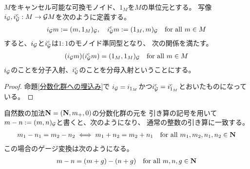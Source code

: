 	\begin{proposition}[分数化群への標準入射]\label{prop:分数化群への標準入射} %
		$M$をキャンセル可能な可換モノイド、$1_M$を$M$の単位元とする。
		写像$i_{{\mathcal{G}}},i_{{\mathcal{G}}}^c:M\to{\ensuremath{{\mathcal{G}}}} M$を次のように定義する。
		\begin{equation*}\begin{split}
			i_{{\mathcal{G}}} m := (m,1_M)_{{\mathcal{G}}},\quad i_{{\mathcal{G}}}^cm := (1_M,m)_{{\mathcal{G}}}
			\quad\text{for all }m\in M
		\end{split}\end{equation*}
		すると、$i_{{\mathcal{G}}}$と$i_{{\mathcal{G}}}^c$は$1:1$のモノイド準同型となり、
		次の関係を満たす。
		\begin{equation*}\begin{split}
			(i_{{\mathcal{G}}} m)(i_{{\mathcal{G}}}^c m) = (1_M,1_M)_{{\mathcal{G}}} \quad\text{for all }m\in M
		\end{split}\end{equation*}
		$i_{{\mathcal{G}}}$のことを分子入射、$i_{{\mathcal{G}}}^c$のことを分母入射ということにする。
	\end{proposition} %
	\begin{proof} 命題\ref{分数化群への埋込み}で
	$i_{{\mathcal{G}}}=i_{1_M}$かつ$i_{{\mathcal{G}}}^c=i_{1_M}^c$とおいたものになっている。
	\end{proof}

	\begin{example}[自然数から整数]\label{eg:自然数から整数} %
		自然数の加法$\mathbf{N}=(\mathbf{N},m_+,0)$の分数化群の元を
		引き算の記号を用いて$m-n:=(m,n)_{{\mathcal{G}}}$と書くと、次のようになり、
		通常の整数の引き算に一致する。
		\begin{equation*}\begin{split}
			m_1-n_1 = m_2-n_2 \iff m_1 + n_2 = m_2 + n_1
			\quad\text{for all }m_1,m_2,n_1,n_2\in \mathbf{N}
		\end{split}\end{equation*}
		この場合のゲージ変換は次のようになる。
		\begin{equation*}\begin{split}
			m - n = (m + g) - (n + g) \quad\text{for all }m,n,g\in \mathbf{N}
		\end{split}\end{equation*}
	\end{example} %

